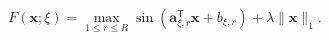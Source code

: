 \documentclass[12pt]{article}
\begin{document}
\[
 F(\boldsymbol{x};\xi)=\max_{1\le r\le R}
 \sin\!\left(\boldsymbol{a}_{\xi,r}^{\mathsf T}\boldsymbol{x}+b_{\xi,r}\right)
 +\lambda\lVert\boldsymbol{x}\rVert_1 .
\]
\end{document}
